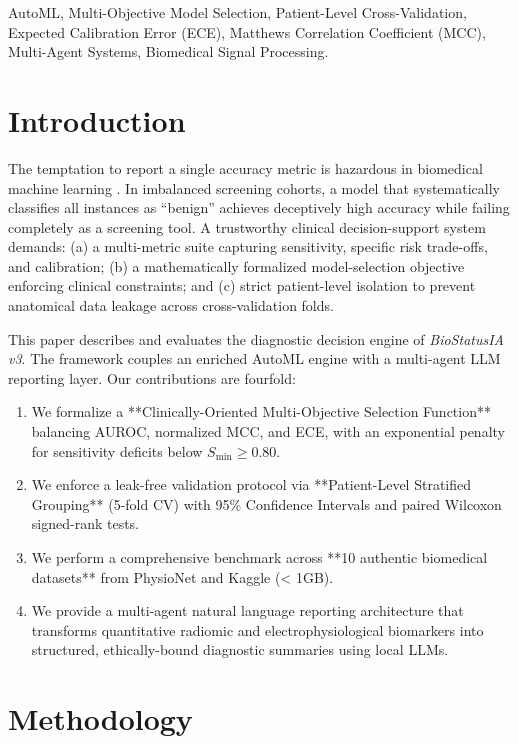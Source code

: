 \documentclass[conference]{IEEEtran}
\begin{document}
\begin{IEEEkeywords}
AutoML, Multi-Objective Model Selection, Patient-Level Cross-Validation, Expected Calibration Error (ECE), Matthews Correlation Coefficient (MCC), Multi-Agent Systems, Biomedical Signal Processing.
\end{IEEEkeywords}

\section{Introduction}
The temptation to report a single accuracy metric is hazardous in biomedical machine learning \cite{he2021automl}. In imbalanced screening cohorts, a model that systematically classifies all instances as ``benign'' achieves deceptively high accuracy while failing completely as a screening tool. A trustworthy clinical decision-support system demands: (a) a multi-metric suite capturing sensitivity, specific risk trade-offs, and calibration; (b) a mathematically formalized model-selection objective enforcing clinical constraints; and (c) strict patient-level isolation to prevent anatomical data leakage across cross-validation folds.

This paper describes and evaluates the diagnostic decision engine of \emph{BioStatusIA v3}. The framework couples an enriched AutoML engine with a multi-agent LLM reporting layer. Our contributions are fourfold:
\begin{enumerate}
    \item We formalize a **Clinically-Oriented Multi-Objective Selection Function** balancing AUROC, normalized MCC, and ECE, with an exponential penalty for sensitivity deficits below $S_{\min} \ge 0.80$.
    \item We enforce a leak-free validation protocol via **Patient-Level Stratified Grouping** (5-fold CV) with 95\% Confidence Intervals and paired Wilcoxon signed-rank tests.
    \item We perform a comprehensive benchmark across **10 authentic biomedical datasets** from PhysioNet and Kaggle (< 1GB).
    \item We provide a multi-agent natural language reporting architecture that transforms quantitative radiomic and electrophysiological biomarkers into structured, ethically-bound diagnostic summaries using local LLMs.
\end{enumerate}

\section{Methodology}
\end{document}
